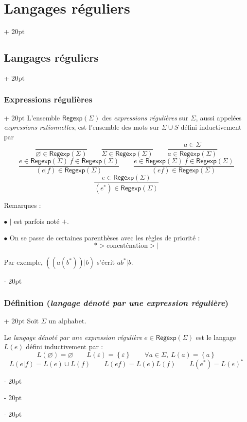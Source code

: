 \documentclass[a4paper, 12pt, twoside]{article}
\newcommand{\lr}[1]{\left( #1 \right)}
\newcommand{\set}[1]{\left\{ #1 \right\}}
\newcommand{\ind}[1][20pt]{\advance\leftskip + #1}
\newcommand{\deind}[1][20pt]{\advance\leftskip - #1}
\newenvironment{indt}[2][20pt]{#2 \par \ind[#1]}{\par \deind} %
\newcommand{\Regexp}{\mathsf{Regexp}}
\begin{document}
\begin{indt}{\section{Langages réguliers}}
\begin{indt}{\subsection{Langages réguliers}}
\begin{indt}{\subsubsection{Expressions régulières}}
                L'ensemble $\Regexp(\Sigma)$ des \emph{expressions régulières} sur $\Sigma$, aussi appelées \emph{expressions rationnelles}, est l'ensemble des mots sur $\Sigma \cup S$ défini inductivement par
                \[
                    \dfrac{}{\varnothing \in \Regexp(\Sigma)}
                    \qquad
                    \dfrac{}{\Sigma \in \Regexp(\Sigma)}
                    \qquad
                    \dfrac{a \in \Sigma}{a \in \Regexp(\Sigma)}
                \]
                \[
                    \dfrac{e \in \Regexp(\Sigma)\ f \in \Regexp(\Sigma)}{(e | f) \in \Regexp(\Sigma)}
                    \qquad
                    \dfrac{e \in \Regexp(\Sigma)\ f \in \Regexp(\Sigma)}{(ef) \in \Regexp(\Sigma)}
                \]
                \[
                    \dfrac{e \in \Regexp(\Sigma)}{(e^*) \in \Regexp(\Sigma)}
                \]

                Remarques :

                $\bullet$ $|$ est parfois noté $+$.

                $\bullet$ On se passe de certaines parenthèses avec les règles de priorité :
                \[
                    * > \text{concaténation} > |
                \]

                Par exemple, $\lr{\lr{a\lr{b^*}} | b}$ s'écrit $a b^* | b$.
            \end{indt}

            \vspace{12pt}
            
            \begin{indt}{\subsubsection{Définition (\textit{langage dénoté par une expression régulière})}}
                Soit $\Sigma$ un alphabet.

                Le \emph{langage dénoté par une expression régulière} $e \in \Regexp(\Sigma)$ est le langage $L(e)$ défini inductivement par :
                \[
                    L(\varnothing) = \varnothing
                    \qquad
                    L(\varepsilon) = \set \varepsilon
                    \qquad
                    \forall a \in \Sigma,\ L(a) = \set a
                \]
                \[
                    L(e | f) = L(e) \cup L(f)
                    \qquad
                    L(ef) = L(e) L(f)
                    \qquad
                    L(e^*) = L(e)^*
                \]


\end{indt}
\end{indt}
\end{indt}
\end{document}
